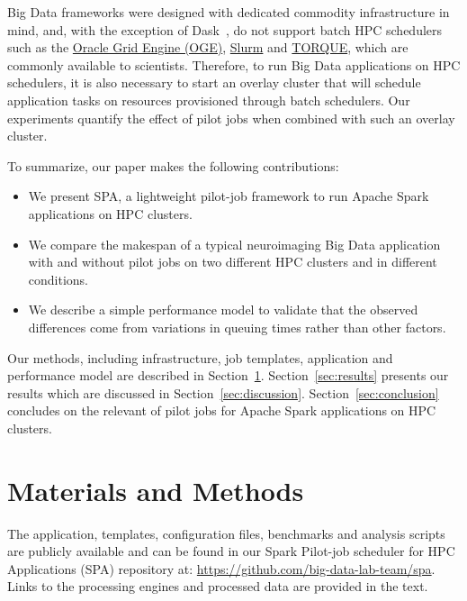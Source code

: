\documentclass{IEEEtran}
\begin{document}
Big Data frameworks were designed with dedicated commodity infrastructure
in mind, and, with the exception of Dask~\cite{rocklin2015dask}, do not support batch
HPC schedulers such as the \href{http://www.univa.com/products/}{Oracle Grid Engine (OGE)},
\href{https://slurm.schedmd.com/}{Slurm} and \href{https://www.adaptivecomputing.com/products/torque/}{TORQUE}, which
are commonly available to scientists. Therefore, to run Big Data
applications on HPC schedulers, it is also necessary to start an overlay
cluster that will schedule application tasks on resources provisioned
through batch schedulers. Our experiments quantify the effect of pilot jobs
when combined with such an overlay cluster.

To summarize, our paper
makes the following contributions:
\begin{itemize}
\item We present SPA, a lightweight pilot-job framework to run Apache Spark
applications on HPC clusters.
\item We compare the makespan of a typical neuroimaging Big Data
application with and without pilot jobs on two different HPC clusters and
in different conditions.
\item We describe a simple performance model to validate that the observed
differences come from variations in queuing times rather than other
factors.
\end{itemize}
Our methods, including infrastructure, job templates, application and
performance model are described in Section~\ref{sec:methods}.
Section~\ref{sec:results} presents our results which are discussed in
Section~\ref{sec:discussion}. Section~\ref{sec:conclusion} concludes on the 
relevant of pilot jobs for Apache Spark applications on HPC clusters.

\section{Materials and Methods}\label{sec:methods}

    The application, templates, configuration files, benchmarks and
    analysis scripts are publicly available and can be found in our Spark
    Pilot-job scheduler for HPC Applications (SPA) repository at:
    \href{https://github.com/big-data-lab-team/spa}{https://github.com/big-data-lab-team/spa}.
    Links to the processing engines and processed data are provided in the
    text.
    
\end{document}
